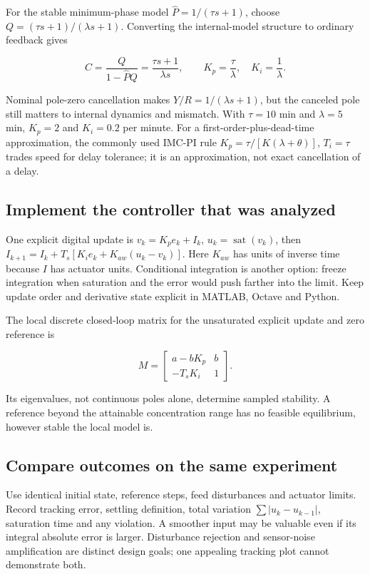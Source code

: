 \documentclass[11pt,a4paper]{article}
\begin{document}
For the stable minimum-phase model $\hat P=1/(\tau s+1)$, choose $Q=(\tau s+1)/(\lambda s+1)$. Converting the internal-model structure to ordinary feedback gives


\[C=\frac{Q}{1-\hat P Q}=\frac{\tau s+1}{\lambda s},\qquad K_p=\frac{\tau}{\lambda},\quad K_i=\frac1\lambda.\]

Nominal pole-zero cancellation makes $Y/R=1/(\lambda s+1)$, but the canceled pole still matters to internal dynamics and mismatch. With $\tau=10$ min and $\lambda=5$ min, $K_p=2$ and $K_i=0.2$ per minute. For a first-order-plus-dead-time approximation, the commonly used IMC-PI rule $K_p=\tau/[K(\lambda+\theta)]$, $T_i=\tau$ trades speed for delay tolerance; it is an approximation, not exact cancellation of a delay.


\subsection{Implement the controller that was analyzed}

One explicit digital update is $v_k=K_pe_k+I_k$, $u_k=\operatorname{sat}(v_k)$, then $I_{k+1}=I_k+T_s[K_ie_k+K_{aw}(u_k-v_k)]$. Here $K_{aw}$ has units of inverse time because $I$ has actuator units. Conditional integration is another option: freeze integration when saturation and the error would push farther into the limit. Keep update order and derivative state explicit in MATLAB, Octave and Python.


The local discrete closed-loop matrix for the unsaturated explicit update and zero reference is


\[M=\begin{bmatrix}a-bK_p&b\\-T_sK_i&1\end{bmatrix}.\]

Its eigenvalues, not continuous poles alone, determine sampled stability. A reference beyond the attainable concentration range has no feasible equilibrium, however stable the local model is.


\subsection{Compare outcomes on the same experiment}

Use identical initial state, reference steps, feed disturbances and actuator limits. Record tracking error, settling definition, total variation $\sum|u_k-u_{k-1}|$, saturation time and any violation. A smoother input may be valuable even if its integral absolute error is larger. Disturbance rejection and sensor-noise amplification are distinct design goals; one appealing tracking plot cannot demonstrate both.
\end{document}

